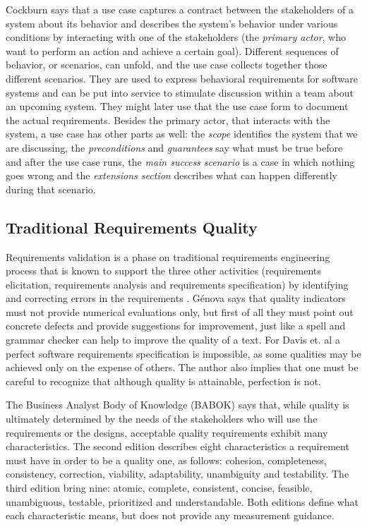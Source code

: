 Cockburn \cite{Cockburn_2000} says that a use case captures a contract between the stakeholders of a system about its behavior and describes the system’s behavior under various conditions by interacting with one of the stakeholders (the \textit{primary actor}, who want to perform an action and achieve a certain goal). Different sequences of behavior, or scenarios, can unfold, and the use case collects together those different scenarios. They are used to express behavioral requirements for software systems and can be put into service to stimulate discussion within a team about an upcoming system. They might later use that the use case form to document the actual requirements. Besides the primary actor, that interacts with the system, a use case has other parts as well: the \textit{scope} identifies the system that we are discussing, the \textit{preconditions} and \textit{guarantees} say what must be true before and after the use case runs, the \textit{main success scenario} is a case in which nothing goes wrong and the \textit{extensions section} describes what can happen differently during that scenario.

\subsection{Traditional Requirements Quality}

Requirements validation is a phase on traditional requirements engineering process that is known to support the three other activities (requirements elicitation, requirements analysis and requirements specification) by identifying and correcting errors in the requirements \cite{Heikkila_et_dot_al_2015}. G{\'e}nova \cite{Genova_2013} says that quality indicators must not provide numerical evaluations only, but first of all they must point out concrete defects and provide suggestions for improvement, just like a spell and grammar checker can help to improve the quality of a text. For Davis et. al \cite{Davis_1993} a perfect software requirements specification is impossible, as some qualities may be achieved only on the expense of others. The author also implies that one must be careful to recognize that although quality is attainable, perfection is not.

The Business Analyst Body of Knowledge (BABOK) \cite{Babok_2015} says that, while quality is ultimately determined by the needs of the stakeholders who will use the requirements or the designs, acceptable quality requirements exhibit many characteristics. The second edition \cite{Babok_2009} describes eight characteristics a requirement must have in order to be a quality one, as follows: cohesion, completeness, consistency, correction, viability, adaptability, unambiguity and testability. The third edition \cite{Babok_2015} bring nine: atomic, complete, consistent, concise, feasible, unambiguous, testable, prioritized and understandable. Both editions \cite{Babok_2009} \cite{Babok_2015} define what each characteristic means, but does not provide any measurement guidance.

